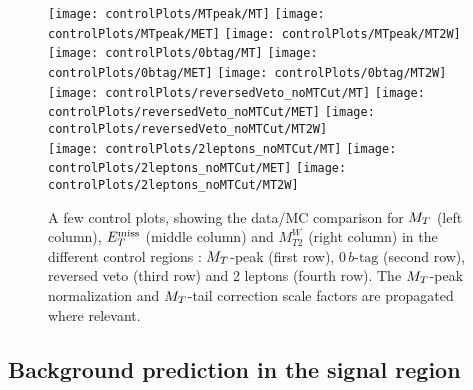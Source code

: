             \begin{figure}[h!]
                \centering
                \texttt{[image: controlPlots/MTpeak/MT]}
                \texttt{[image: controlPlots/MTpeak/MET]}
                \texttt{[image: controlPlots/MTpeak/MT2W]}\\
                \texttt{[image: controlPlots/0btag/MT]}
                \texttt{[image: controlPlots/0btag/MET]}
                \texttt{[image: controlPlots/0btag/MT2W]}\\
                \texttt{[image: controlPlots/reversedVeto\_noMTCut/MT]}
                \texttt{[image: controlPlots/reversedVeto\_noMTCut/MET]}
                \texttt{[image: controlPlots/reversedVeto\_noMTCut/MT2W]}\\
                \texttt{[image: controlPlots/2leptons\_noMTCut/MT]}
                \texttt{[image: controlPlots/2leptons\_noMTCut/MET]}
                \texttt{[image: controlPlots/2leptons\_noMTCut/MT2W]}\\
                \caption{A few control plots, showing the data/MC comparison for $M_T$ (left column),
                        $E_T^\text{miss}$ (middle column) and $M_{T2}^W$ (right column) in the different control
                        regions : $M_T$-peak (first row), $0\, b\text{-tag}$ (second row), reversed veto (third
                        row) and 2 leptons (fourth row). The $M_T$-peak normalization and $M_T$-tail
                        correction scale factors are propagated where relevant.}
                        \label{fig:preselControlPlots}
            \end{figure}

        \subsection{Background prediction in the signal region}

